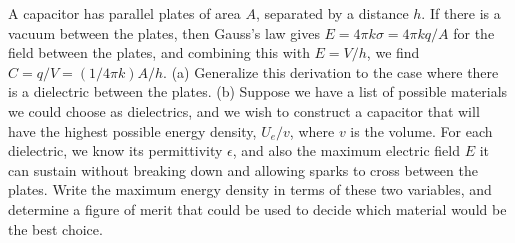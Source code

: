 A capacitor has parallel plates of area $A$, separated by a distance $h$. If there is a vacuum between the plates, then
Gauss's law gives $E=4\pi k\sigma=4\pi kq/A$ for the field between the plates, and combining this with $E=V/h$, we find
$C=q/V=(1/4\pi k)A/h$. (a) Generalize this derivation to the case where there is a dielectric between the plates.
(b) Suppose we have a list of possible materials we could choose as dielectrics, and we wish to construct a capacitor
that will have the highest possible energy density, $U_e/v$, where $v$ is the volume. For each dielectric, we know its
permittivity $\epsilon$, and also the maximum electric field $E$ it can sustain without breaking down and allowing sparks to cross between
the plates. Write the maximum energy density in terms of these two variables, and determine a figure of merit that could be used to
decide which material would be the best choice.
